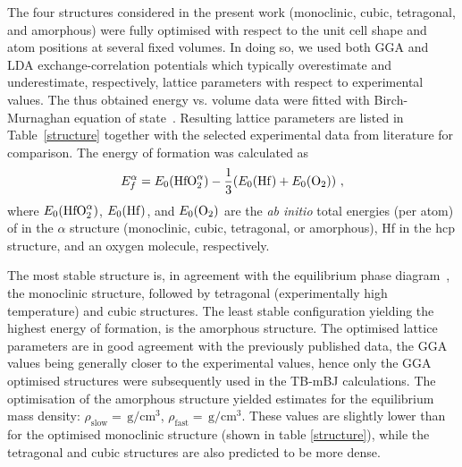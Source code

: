 \documentclass[10pt,a4paper,twocolumn]{article}
\begin{document}
The four structures considered in the present work (monoclinic, cubic, tetragonal, and amorphous) were fully optimised with respect to the unit cell shape and atom positions at several fixed volumes.
In doing so, we used both GGA and LDA exchange-correlation potentials which typically overestimate and underestimate, respectively, lattice parameters with respect to experimental values.
The thus obtained energy vs. volume data were fitted with Birch-Murnaghan equation of state~\cite{Birch1947}.
Resulting lattice parameters are listed in Table~\ref{structure} together with the selected experimental data from literature for comparison.
The energy of formation was calculated as
\begin{equation}
  E_f^\alpha=E_0(\ce{HfO2}^\alpha) - \frac13 (E_0(\ce{Hf}) + E_0(\ce{O2}))\ ,
\end{equation}
where $E_0(\ce{HfO2}^\alpha)$, $E_0(\ce{Hf})$, and $E_0(\ce{O2})$ are the \textit{ab initio} total energies (per atom) of  in the $\alpha$ structure (monoclinic, cubic, tetragonal, or amorphous), Hf in the hcp structure, and an oxygen molecule, respectively.

The most stable structure is, in agreement with the equilibrium phase diagram~\cite{Villars2014-px}, the monoclinic structure, followed by tetragonal (experimentally high temperature) and cubic structures.
The least stable configuration yielding the highest energy of formation, is the amorphous structure.
The optimised lattice parameters are in good agreement with the previously published data, the GGA values being generally closer to the experimental values, hence only the GGA optimised structures were subsequently used in the TB-mBJ calculations.
The optimisation of the amorphous structure yielded estimates for the equilibrium mass density: $\rho_{\mathrm{slow}}=\,\mathrm{g/cm^3}$, $\rho_{\mathrm{fast}}=\,\mathrm{g/cm^3}$.
These values are slightly lower than for the optimised monoclinic structure (shown in table \ref{structure}), while the tetragonal and cubic structures are also predicted to be more dense.
\end{document}
